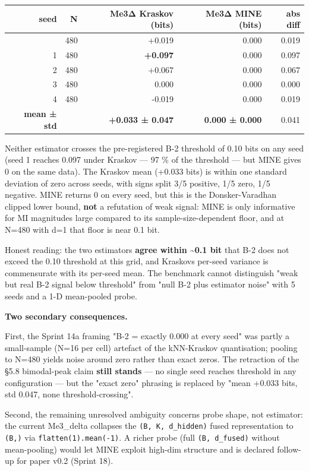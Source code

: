\documentclass[
]{article}
\newcounter{none} %
\begin{document}
{\def\LTcaptype{none} %
\begin{longtable}[]{@{}rrrrr@{}}
\toprule\noalign{}
seed & N & Me3Δ Kraskov (bits) & Me3Δ MINE (bits) & abs diff \\
\midrule\noalign{}
\endhead
\bottomrule\noalign{}
\endlastfoot
0 & 480 & +0.019 & 0.000 & 0.019 \\
1 & 480 & \textbf{+0.097} & 0.000 & 0.097 \\
2 & 480 & +0.067 & 0.000 & 0.067 \\
3 & 480 & 0.000 & 0.000 & 0.000 \\
4 & 480 & -0.019 & 0.000 & 0.019 \\
\textbf{mean ± std} & & \textbf{+0.033 ± 0.047} & \textbf{0.000 ± 0.000}
& 0.041 \\
\end{longtable}
}

Neither estimator crosses the pre-registered B-2 threshold of 0.10 bits
on any seed (seed 1 reaches 0.097 under Kraskov --- 97 \% of the
threshold --- but MINE gives 0 on the same data). The Kraskov mean
(+0.033 bits) is within one standard deviation of zero across seeds,
with signs split 3/5 positive, 1/5 zero, 1/5 negative. MINE returns 0 on
every seed, but this is the Donsker-Varadhan clipped lower bound,
\textbf{not} a refutation of weak signal: MINE is only informative for
MI magnitudes large compared to its sample-size-dependent floor, and at
N=480 with d=1 that floor is near 0.1 bit.

Honest reading: the two estimators \textbf{agree within
\textasciitilde0.1 bit} that B-2 does not exceed the 0.10 threshold at
this grid, and Kraskov\textquotesingle s per-seed variance is
commensurate with its per-seed mean. The benchmark cannot distinguish
"weak but real B-2 signal below threshold" from "null B-2 plus estimator
noise" with 5 seeds and a 1-D mean-pooled probe.

\textbf{Two secondary consequences.}

First, the Sprint 14a framing "B-2 = exactly 0.000 at every seed" was
partly a small-sample (N=16 per cell) artefact of the kNN-Kraskov
quantisation; pooling to N=480 yields noise around zero rather than
exact zeros. The retraction of the §5.8 bimodal-peak claim \textbf{still
stands} --- no single seed reaches threshold in any configuration ---
but the "exact zero" phrasing is replaced by "mean +0.033 bits, std
0.047, none threshold-crossing".

Second, the remaining unresolved ambiguity concerns probe shape, not
estimator: the current Me3\_delta collapses the
\texttt{(B,\ K,\ d\_hidden)} fused representation to \texttt{(B,)} via
\texttt{flatten(1).mean(-1)}. A richer probe (full
\texttt{(B,\ d\_fused)} without mean-pooling) would let MINE exploit
high-dim structure and is declared follow-up for paper v0.2 (Sprint 18).
\end{document}

